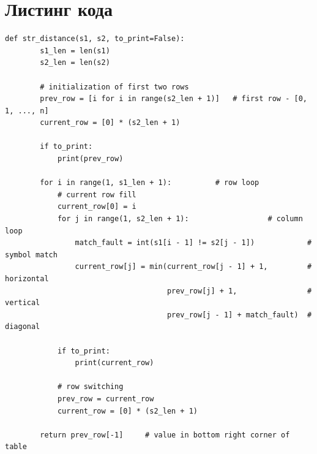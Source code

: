 \documentclass[14pt, a4paper]{report}
\begin{document}
	\section{Листинг кода}
	\begin{lstlisting}[label=some-code,caption=Расстояние Левенштейна (матрично)]
	def str_distance(s1, s2, to_print=False):
	    s1_len = len(s1)
	    s2_len = len(s2)
	
	    # initialization of first two rows
	    prev_row = [i for i in range(s2_len + 1)]   # first row - [0, 1, ..., n]
	    current_row = [0] * (s2_len + 1)
	
	    if to_print:
	        print(prev_row)
	
	    for i in range(1, s1_len + 1):          # row loop
	        # current row fill
	        current_row[0] = i
	        for j in range(1, s2_len + 1):                  # column loop
	            match_fault = int(s1[i - 1] != s2[j - 1])            # symbol match
	            current_row[j] = min(current_row[j - 1] + 1,         # horizontal
	                                 prev_row[j] + 1,                # vertical
	                                 prev_row[j - 1] + match_fault)  # diagonal
	
	        if to_print:
	            print(current_row)
	
	        # row switching
	        prev_row = current_row
	        current_row = [0] * (s2_len + 1)
	
	    return prev_row[-1]     # value in bottom right corner of table
	\end{lstlisting}
\end{document}
